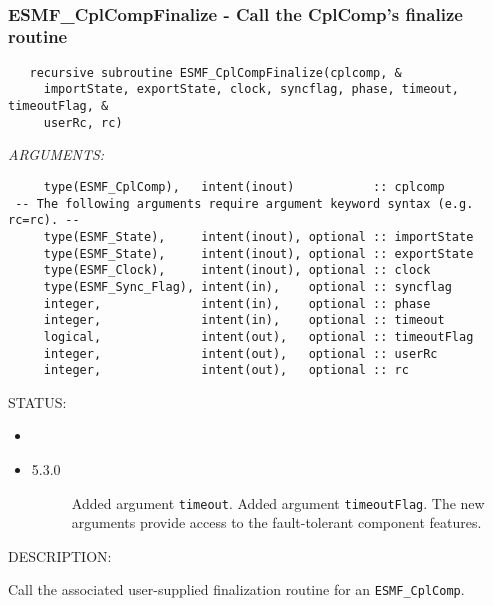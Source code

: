  
\mbox{}\hrulefill\ 
 
\subsubsection [ESMF\_CplCompFinalize] {ESMF\_CplCompFinalize - Call the CplComp's finalize routine}


  
\begin{verbatim}   recursive subroutine ESMF_CplCompFinalize(cplcomp, &
     importState, exportState, clock, syncflag, phase, timeout, timeoutFlag, &
     userRc, rc)\end{verbatim}{\em ARGUMENTS:}
\begin{verbatim}     type(ESMF_CplComp),   intent(inout)           :: cplcomp
 -- The following arguments require argument keyword syntax (e.g. rc=rc). --
     type(ESMF_State),     intent(inout), optional :: importState
     type(ESMF_State),     intent(inout), optional :: exportState
     type(ESMF_Clock),     intent(inout), optional :: clock
     type(ESMF_Sync_Flag), intent(in),    optional :: syncflag
     integer,              intent(in),    optional :: phase
     integer,              intent(in),    optional :: timeout
     logical,              intent(out),   optional :: timeoutFlag
     integer,              intent(out),   optional :: userRc
     integer,              intent(out),   optional :: rc\end{verbatim}
{\sf STATUS:}
   \begin{itemize}
   \item{}
   \item{}
   \begin{description}
   \item[5.3.0] Added argument {\tt timeout}.
                Added argument {\tt timeoutFlag}.
                The new arguments provide access to the fault-tolerant component
                features.
   \end{description}
   \end{itemize}
  
{\sf DESCRIPTION:\\ }


   Call the associated user-supplied finalization routine for
   an {\tt ESMF\_CplComp}.
  
